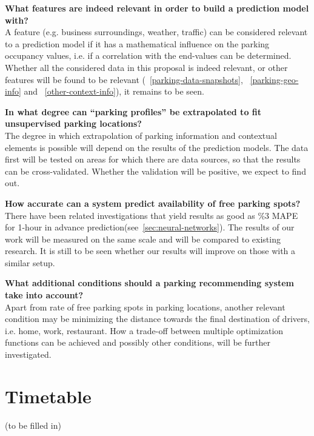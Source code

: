 \documentclass{article}
\begin{document}
\vspace{2mm}
\textbf{What features are indeed relevant in order to build a prediction model with?}\\
A feature (e.g. business surroundings, weather, traffic) can be considered relevant to a prediction model if it has a mathematical influence on the parking occupancy values, i.e. if a correlation with the end-values can be determined. Whether all the considered data in this proposal is indeed relevant, or other features will be found to be relevant (~\ref{parking-data-snapshots}, ~\ref{parking-geo-info} and ~\ref{other-context-info}), it remains to be seen.

\vspace{2mm}
\textbf{In what degree can ``parking profiles'' be extrapolated to fit unsupervised parking locations?}\\
The degree in which extrapolation of parking information and contextual elements is possible will depend on the results of the prediction models. The data first will be tested on areas for which there are data sources, so that the results can be cross-validated. Whether the validation will be positive, we expect to find out.

\vspace{2mm}
\textbf{How accurate can a system predict availability of free parking spots?} \\
There have been related investigations that yield results as good as \%3 MAPE for 1-hour in advance prediction(see~\ref{sec:neural-networks}). The results of our work will be measured on the same scale and will be compared to existing research. It is still to be seen whether our results will improve on those with a similar setup.

\vspace{2mm}
\textbf{What additional conditions should a parking recommending system take into account?} \\
Apart from rate of free parking spots in parking locations, another relevant condition may be minimizing the distance towards the final destination of drivers, i.e. home, work, restaurant. How a trade-off between multiple optimization functions can be achieved and possibly other conditions, will be further investigated.

\section{Timetable}
(to be filled in)

\nocite{*}

\printbibliography
\end{document}
